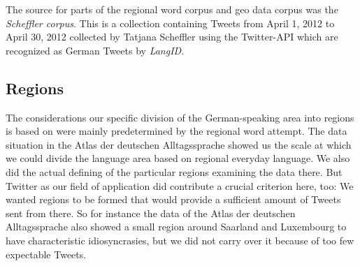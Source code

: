\documentclass[../Main.tex]{subfiles}
\begin{document}
The source for parts of the regional word corpus and geo data corpus was the \emph{Scheffler corpus}. This is a collection containing Tweets from April 1, 2012 to April 30, 2012 collected by Tatjana Scheffler using the Twitter-API which are recognized as German Tweets by \emph{LangID.}

\subsection{Regions}
The considerations our specific division of the German-speaking area into regions is based on were mainly predetermined by the regional word attempt. The data situation in the Atlas der deutschen Alltagssprache showed us the scale at which we could divide the language area based on regional everyday language. We also did the actual defining of the particular regions examining the data there. But Twitter as our field of application did contribute a crucial criterion here, too: We wanted regions to be formed that would provide a sufficient amount of Tweets sent from there. So for instance the data of the Atlas der deutschen Alltagssprache also showed a small region around Saarland and Luxembourg to have characteristic idiosyncrasies, but we did not carry over it because of too few expectable Tweets.
\end{document}
